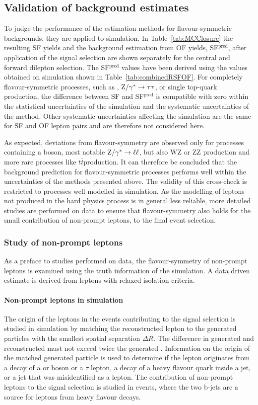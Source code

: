 \subsection{Validation of background estimates}
\label{sec:validation}
To judge the performance of the estimation methods for flavour-symmetric backgrounds, they are applied to simulation. In Table~\ref{tab:MCClosure} the resulting SF yields and the background estimation from OF yields, SF$^{\text{pred}}$, after application of the signal selection are shown separately for the central and forward dilepton selection. The SF$^{\text{pred}}$ values have been derived using the \Rsfof values obtained on simulation shown in Table~\ref{tab:combinedRSFOF}. For completely flavour-symmetric processes, such as \ttbar, $\mathrm{Z}/\gamma^{*}\rightarrow \tau\tau$, or single top-quark production, the difference between SF and SF$^{\text{pred}}$ is compatible with zero within the statistical uncertainties of the simulation and the systematic uncertainties of the method. Other systematic uncertainties affecting the simulation are the same for SF and OF lepton pairs and are therefore not considered here. 

 As expected, deviations from flavour-symmetry are observed only for processes containing a \Z boson, most notable $\mathrm{Z}/\gamma^{*}\rightarrow \ell\ell$, but also $\mathrm{WZ}$ or $\mathrm{ZZ}$ production and more rare processes like $t\bar{t}$\Z production. It can therefore be concluded that the background prediction for flavour-symmetric processes performs well within the uncertainties of the methods presented above. The validity of this cross-check is restricted to processes well modelled in simulation. As the modelling of leptons not produced in the hard physics process is in general less reliable, more detailed studies are performed on data to ensure that flavour-symmetry also holds for the small contribution of non-prompt leptons, to the final event selection.
\subsubsection*{Study of non-prompt leptons}
As a preface to studies performed on data, the flavour-symmetry of non-prompt leptons is examined using the truth information of the simulation. A data driven estimate is derived from leptons with relaxed isolation criteria.
\paragraph*{Non-prompt leptons in simulation}
The origin of the leptons in the events contributing to the signal selection is studied in simulation by matching the reconstructed lepton to the generated particles with the smallest spatial separation $\Delta R$. The difference in generated and reconstructed \pt must not exceed twice the generated \pt. Information on the origin of the matched generated particle is used to determine if the lepton originates from a decay of a \Z or \W boson or a $\tau$ lepton, a decay of a heavy flavour quark inside a jet, or a jet that was misidentified as a lepton. The contribution of non-prompt leptons to the signal selection is studied in \ttbar events, where the two b-jets are a source for leptons from heavy flavour decays. 

